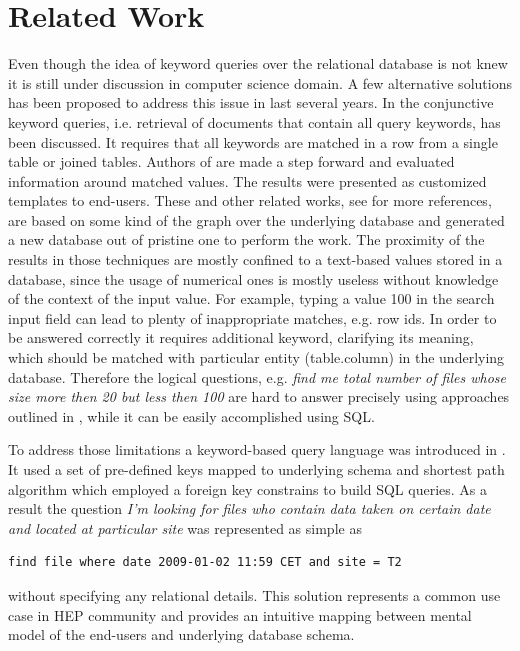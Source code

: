 \documentclass[1p,times]{elsarticle}
\begin{document}

\section{Related Work\label{RelatedWork}}
Even though the idea of keyword queries over the relational database
is not knew it is still under discussion in computer science domain.
A few alternative solutions has been proposed to address this issue
in last several years. In \cite{DBXplorer} the conjunctive keyword queries,
i.e. retrieval of documents that contain all query keywords, has
been discussed. It requires that all keywords are matched in a row from a
single table or joined tables. Authors of \cite{QueryAnswer} are made a step forward
and evaluated information around matched values. The results were presented as
customized templates to end-users. 
These and other related works, see \cite{DBXplorer, QueryAnswer} 
for more references, are based on some kind of the graph over the underlying 
database and generated a new database out of pristine one to perform the work.
The proximity of the results in those techniques are mostly confined to a 
text-based values stored in a database, since the usage of numerical ones 
is mostly useless without knowledge of the context of the input value. 
For example, typing a value 100 in the search input field can lead to 
plenty of inappropriate matches, e.g. row ids. In order to be
answered correctly it requires additional keyword, clarifying its meaning, 
which should be matched with particular entity (table.column) in the 
underlying database. Therefore the logical questions, e.g.
{\it find me total number of files whose size more then 20 but less then 
100} are hard to answer precisely using approaches outlined in \cite{DBXplorer, QueryAnswer}, 
while it can be easily accomplished using SQL. 

To address those limitations a keyword-based query language was introduced in \cite{DBS-QL}.
It used a set of pre-defined keys mapped to underlying schema and shortest path
algorithm which employed a foreign key constrains to build SQL queries. As a result
the question
{\it I'm looking for files who contain data taken on certain date and located at
particular site} was represented as simple as \cite{DBS-QL}
\begin{verbatim}
find file where date 2009-01-02 11:59 CET and site = T2
\end{verbatim}
without specifying any relational details.
This solution represents a common use case in HEP community and provides
an intuitive mapping between mental model of the end-users and 
underlying database schema.
\end{document}

